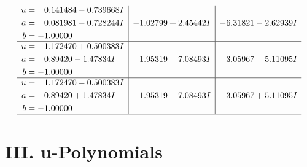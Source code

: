 \documentclass[1p]{elsarticle_modified}
\theoremstyle{definition}
\begin{document}
$$\begin{array}{c|c|c}
\begin{aligned}
u &= \phantom{-}0.141484 - 0.739668 I \\
a &= \phantom{-}0.081981 - 0.728244 I \\
b &= -1.00000\phantom{ +0.000000I}\end{aligned}
 & -1.02799 + 2.45442 I & -6.31821 - 2.62939 I \\ \hline\begin{aligned}
u &= \phantom{-}1.172470 + 0.500383 I \\
a &= \phantom{-}0.89420 - 1.47834 I \\
b &= -1.00000\phantom{ +0.000000I}\end{aligned}
 & \phantom{-}1.95319 + 7.08493 I & -3.05967 - 5.11095 I \\ \hline\begin{aligned}
u &= \phantom{-}1.172470 - 0.500383 I \\
a &= \phantom{-}0.89420 + 1.47834 I \\
b &= -1.00000\phantom{ +0.000000I}\end{aligned}
 & \phantom{-}1.95319 - 7.08493 I & -3.05967 + 5.11095 I\\
 \hline 
 \end{array}$$\newpage
\newpage\renewcommand{\arraystretch}{1}
\centering \section*{ III. u-Polynomials}
\end{document}
